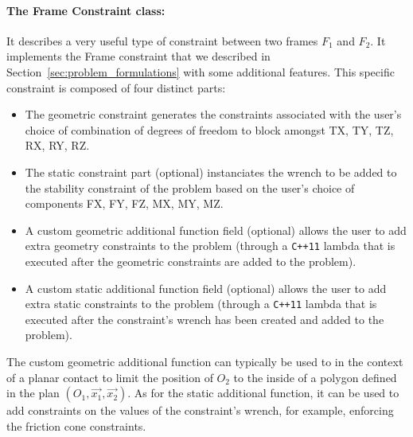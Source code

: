 \paragraph{The Frame Constraint class:}
It describes a very useful type of constraint between two frames $F_1$ and $F_2$.
It implements the Frame constraint that we described in Section~\ref{sec:problem_formulations} with some additional features.
This specific constraint is composed of four distinct parts:
\begin{itemize}
  \item The geometric constraint generates the constraints associated with the user's choice of combination of degrees of freedom to block amongst TX, TY, TZ, RX, RY, RZ.
  \item The static constraint part (optional) instanciates the wrench to be added to the stability constraint of the problem based on the user's choice of components FX, FY, FZ, MX, MY, MZ.
  \item A custom geometric additional function field (optional) allows the user to add extra geometry constraints to the problem (through a \texttt{C++11} lambda that is executed after the geometric constraints are added to the problem).
  \item A custom static additional function field (optional) allows the user to add extra static constraints to the problem (through a \texttt{C++11} lambda that is executed after the constraint's wrench has been created and added to the problem).
\end{itemize}
The custom geometric additional function can typically be used to in the context of a planar contact to limit the position of $O_2$ to the inside of a polygon defined in the plan $(O_1,\vec{x_1},\vec{x_2})$.
As for the static additional function, it can be used to add constraints on the values of the constraint's wrench, for example, enforcing the friction cone constraints.


